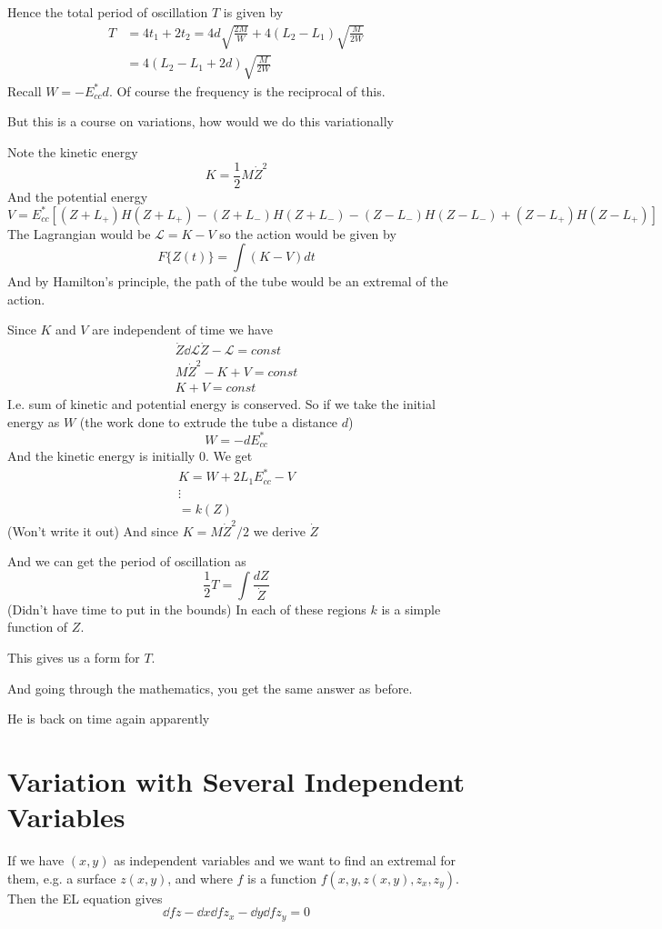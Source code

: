 \documentclass{X:/Documents/Coding/Latex/myassignment}
\begin{document}
Hence the total period of oscillation $T$ is given by
\begin{align*}
	T &= 4t_1 + 2t_2 = 4d \sqrt{\frac{2M}{W}} + 4(L_2 - L_1) \sqrt{\frac{M}{2W}}\\
	&= 4(L_2 - L_1 + 2d) \sqrt{\frac{M}{2W}}
\end{align*}
Recall $W = -E_{cc}^* d$.
Of course the frequency is the reciprocal of this.


But this is a course on variations, how would we do this variationally

Note the kinetic energy
\[K = \frac12 M \dot Z^2\]
And the potential energy 
\[V = E_{cc}^* \left[(Z + L_+) H(Z+L_+) - (Z+L_-) H(Z + L_-) - (Z-L_-) H(Z-L_-) + (Z-L_+) H(Z-L_+)\right]\]
The Lagrangian would be $\mathcal{L} = K-V$ so the action would be given by
\[F \{Z(t)\} = \int (K-V) dt\]
And by Hamilton's principle, the path of the tube would be an extremal of the action.


Since $K$ and $V$ are independent of time we have
\begin{align*}
	\dot{Z} \dd{\mathcal{L}}{\dot{Z}} - \mathcal{L} = const\\
	M\dot{Z}^2 - K + V = const\\
	K+V = const
\end{align*}
I.e. sum of kinetic and potential energy is conserved. So if we take the initial energy as $W$ (the work done to extrude the tube a distance $d$) 
\[W = -d E_{cc}^*\]
And the kinetic energy is initially $0$.
We get
\begin{align*}
	K = W + 2L_1 E_{cc}^* - V\\
	\vdots\\
	= k(Z)
\end{align*}
(Won't write it out)
And since $ K = M\dot{Z}^2/2$ we derive $\dot{Z}$


And we can get the period of oscillation as
\[\frac12 T = \int \frac{dZ}{\dot{Z}} \]
(Didn't have time to put in the bounds)
In each of these regions $k$ is a simple function of $Z$.

This gives us a form for $T$.

And going through the mathematics, you get the same answer as before.


He is back on time again apparently




\section{Variation with Several Independent Variables}
If we have $(x,y)$ as independent variables and we want to find an extremal for them, e.g. a surface $z(x,y)$, and where $f$ is a function $f(x,y,z(x,y),z_x,z_y)$. Then the EL equation gives
\[\dd fz - \dd{}x \dd{f}{z_x} - \dd{}y \dd{f}{z_y} = 0\]
\end{document}
